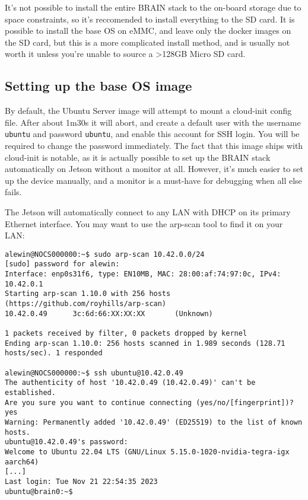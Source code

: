 \documentclass[11pt]{article}
\begin{document}
It's not possible to install the entire BRAIN stack to the on-board storage due to space constraints, so it's reccomended to install everything to the SD card. It is possible to install the base OS on eMMC, and leave only the docker images on the SD card, but this is a more complicated install method, and is usually not worth it unless you're unable to source a \textgreater{}128GB Micro SD card.

\subsection{Setting up the base OS image}

By default, the Ubuntu Server image will attempt to mount a cloud-init config file. After about 1m30s it will abort, and create a default user with the username \texttt{ubuntu} and password \texttt{ubuntu}, and enable this account for SSH login. You will be required to change the password immediately. The fact that this image ships with cloud-init is notable, as it is actually possible to set up the BRAIN stack automatically on Jetson without a monitor at all. However, it's much easier to set up the device manually, and a monitor is a must-have for debugging when all else fails.

The Jetson will automatically connect to any LAN with DHCP on its primary Ethernet interface. You may want to use the arp-scan tool to find it on your LAN:

\lstset{style=console}
\begin{lstlisting}
alewin@NOCS000000:~$ sudo arp-scan 10.42.0.0/24
[sudo] password for alewin:
Interface: enp0s31f6, type: EN10MB, MAC: 28:00:af:74:97:0c, IPv4: 10.42.0.1
Starting arp-scan 1.10.0 with 256 hosts (https://github.com/royhills/arp-scan)
10.42.0.49      3c:6d:66:XX:XX:XX       (Unknown)

1 packets received by filter, 0 packets dropped by kernel
Ending arp-scan 1.10.0: 256 hosts scanned in 1.989 seconds (128.71 hosts/sec). 1 responded

alewin@NOCS000000:~$ ssh ubuntu@10.42.0.49
The authenticity of host '10.42.0.49 (10.42.0.49)' can't be established.
Are you sure you want to continue connecting (yes/no/[fingerprint])? yes
Warning: Permanently added '10.42.0.49' (ED25519) to the list of known hosts.
ubuntu@10.42.0.49's password:
Welcome to Ubuntu 22.04 LTS (GNU/Linux 5.15.0-1020-nvidia-tegra-igx aarch64)
[...]
Last login: Tue Nov 21 22:54:35 2023
ubuntu@brain0:~$

\end{lstlisting}
\end{document}
